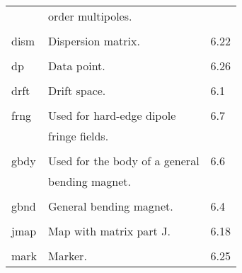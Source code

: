 \begin{center}
\begin{tabular}{lll}
               &         order multipoles.                    &      \\
\vspace{-3mm}& &\\
\hspace{1.5em}dism    &         Dispersion matrix.                   &  \hspace{2em}6.22\\
\vspace{-3mm}& &\\
\hspace{1.5em}dp      &         Data point.                          &  \hspace{2em}6.26\\
\vspace{-3mm}& &\\
\hspace{1.5em}drft    &         Drift space.                         &  \hspace{2em}6.1 \\
\vspace{-3mm}& &\\
\hspace{1.5em}frng    &         Used for hard-edge dipole       &  \hspace{2em}6.7 \\
               &             fringe fields.                  &      \\
\vspace{-3mm}& &\\
\hspace{1.5em}gbdy    &         Used for the body of a general  &  \hspace{2em}6.6 \\
               &             bending magnet.                 & \\
\vspace{-3mm}& &\\
\hspace{1.5em}gbnd    &         General bending magnet.         &  \hspace{2em}6.4 \\
\vspace{-3mm}& &\\
\hspace{1.5em}jmap    &         Map with matrix part J.              &  \hspace{2em}6.18\\
\vspace{-3mm}& &\\
\hspace{1.5em}mark    &         Marker.                              &  \hspace{2em}6.25\\

\end{tabular}
\end{center}
